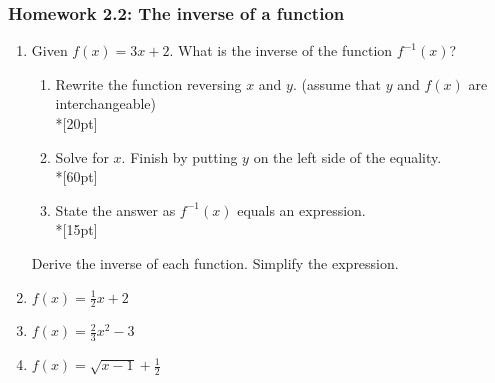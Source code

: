 \documentclass[12pt, oneside]{article}
\begin{document}
\newpage
\subsubsection*{Homework 2.2: The inverse of a function}
  \begin{enumerate}

  \item Given $f(x)=3x+2$. What is the inverse of the function $f^{-1} (x)$?

  \begin{enumerate}
      \item Rewrite the function reversing $x$ and $y$. (assume that $y$ and $f(x)$ are interchangeable)\\*[20pt]
      \item Solve for $x$. Finish by putting $y$ on the left side of the equality.\\*[60pt]
      \item State the answer as $f^{-1} (x)$ equals an expression.\\*[15pt]
  \end{enumerate}

  Derive the inverse of each function. Simplify the expression.
  \item   $f(x)=\frac{1}{2}x+2$
  \item   $f(x)=\frac{2}{3}x^2-3$
  \item   $f(x)=\sqrt{x-1}+\frac{1}{2}$

  \end{enumerate}
\end{document}

